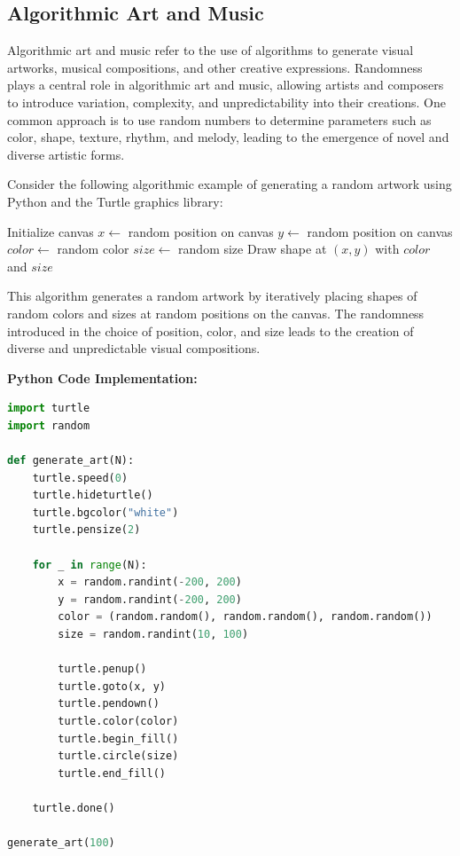 \documentclass[12pt]{book} %
\begin{document}
\subsection{Algorithmic Art and Music}

Algorithmic art and music refer to the use of algorithms to generate visual artworks, musical compositions, and other creative expressions. Randomness plays a central role in algorithmic art and music, allowing artists and composers to introduce variation, complexity, and unpredictability into their creations. One common approach is to use random numbers to determine parameters such as color, shape, texture, rhythm, and melody, leading to the emergence of novel and diverse artistic forms.

Consider the following algorithmic example of generating a random artwork using Python and the Turtle graphics library:
\FloatBarrier
\begin{algorithm}
\caption{Random Art Generation}\label{alg:random_art}
\begin{algorithmic}[1]
\State Initialize canvas
 
    \State $x \gets$ random position on canvas
    \State $y \gets$ random position on canvas
    \State $color \gets$ random color
    \State $size \gets$ random size
    \State Draw shape at $(x, y)$ with $color$ and $size$
\EndFor
\EndProcedure
\end{algorithmic}
\end{algorithm}
\FloatBarrier

This algorithm generates a random artwork by iteratively placing shapes of random colors and sizes at random positions on the canvas. The randomness introduced in the choice of position, color, and size leads to the creation of diverse and unpredictable visual compositions.

\textbf{Python Code Implementation:}
\FloatBarrier
\begin{lstlisting}[language=Python, caption=Python implementation of Random Art Generation]
import turtle
import random

def generate_art(N):
    turtle.speed(0)
    turtle.hideturtle()
    turtle.bgcolor("white")
    turtle.pensize(2)

    for _ in range(N):
        x = random.randint(-200, 200)
        y = random.randint(-200, 200)
        color = (random.random(), random.random(), random.random())
        size = random.randint(10, 100)
        
        turtle.penup()
        turtle.goto(x, y)
        turtle.pendown()
        turtle.color(color)
        turtle.begin_fill()
        turtle.circle(size)
        turtle.end_fill()

    turtle.done()

generate_art(100)
\end{lstlisting}
\FloatBarrier
\end{document}
